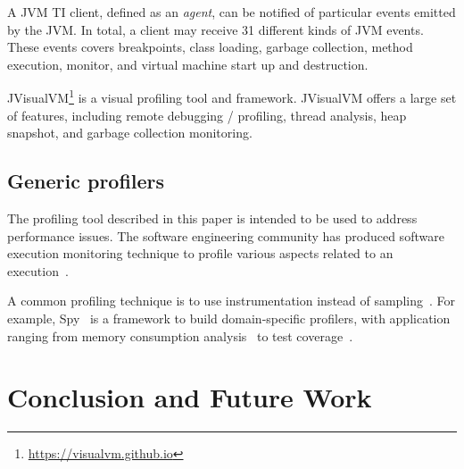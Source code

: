 \documentclass[10pt,preprint,nonatbib]{sigplanconf}
\newcommand{\seclabel}[1]{\label{sec:#1}}
\begin{document}
A JVM TI client, defined as an \emph{agent}, can be notified of particular events emitted by the JVM. In total, a client may receive 31 different kinds of JVM events. These events covers breakpoints, class loading, garbage collection, method execution, monitor, and virtual machine start up and destruction.

JVisualVM\footnote{\url{https://visualvm.github.io}} is a visual profiling tool and framework. JVisualVM offers a large set of features, including remote debugging / profiling, thread analysis, heap snapshot, and garbage collection monitoring. 

\subsection{Generic profilers}

The profiling tool described in this paper is intended to be used to address performance issues. The software engineering community has produced software execution monitoring technique to profile various aspects related to an execution~\cite{Ress12a,Ress12b}. 

A common profiling technique is to use instrumentation instead of sampling~\cite{Metz05a}. For example, Spy~\cite{Berg11h} is a framework to build domain-specific profilers, with application ranging from memory consumption analysis~\cite{Infa15a} to test coverage~\cite{Berg12c}.

%
%
%
%

\section{Conclusion and Future Work}\seclabel{conclusion}
\end{document}
